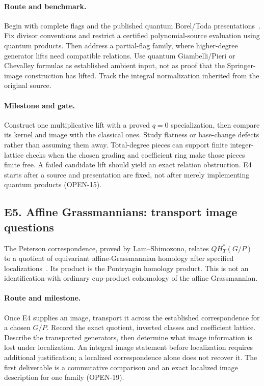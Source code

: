\documentclass[11pt,letterpaper]{article}
\begin{document}
\paragraph{Route and benchmark.}
Begin with complete flags and the published quantum Borel/Toda
presentations~\cite{Kim}. Fix divisor conventions and restrict a certified
polynomial-source evaluation using quantum products. Then address a
partial-flag family, where higher-degree generator lifts need compatible
relations. Use quantum Giambelli/Pieri or Chevalley formulas as established
ambient input, not as proof that the Springer-image construction has lifted.
Track the integral normalization inherited from the original source.

\paragraph{Milestone and gate.}
Construct one multiplicative lift with a proved \(q=0\) specialization,
then compare its kernel and image with the classical ones. Study flatness
or base-change defects rather than assuming them away. Total-degree
pieces can support finite integer-lattice checks when the chosen grading
and coefficient ring make those pieces finite free. A failed candidate
lift should yield an exact relation obstruction. E4 starts after a source
and presentation are fixed, not after merely implementing quantum products
(OPEN-15).

\subsection*{E5. Affine Grassmannians: transport image questions}
The Peterson correspondence, proved by Lam--Shimozono, relates
\(QH_T^*(G/P)\) to a quotient of equivariant affine-Grassmannian homology
after specified localizations~\cite{LS}. Its product is the Pontryagin
homology product. This is not an identification with ordinary cup-product
cohomology of the affine Grassmannian.

\paragraph{Route and milestone.}
Once E4 supplies an image, transport it across the established
correspondence for a chosen \(G/P\). Record the exact quotient, inverted
classes and coefficient lattice. Describe the transported generators,
then determine what image information is lost under localization.
An integral image statement before localization requires additional
justification; a localized correspondence alone does not recover it.
The first deliverable is a commutative comparison and an exact localized
image description for one family (OPEN-19).
\end{document}
